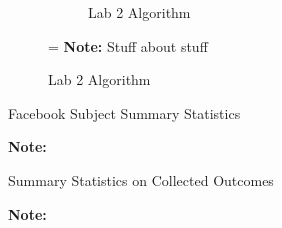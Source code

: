 \documentclass[12pt,letterpaper]{article}
\begin{document}
\begin{figure}[ht]
\begin{subfigure}{.5\textwidth}
        \caption{Lab 2 Algorithm}
         \label{fig:lab2_algo}
    \end{subfigure}
=
\footnotesize \textbf{Note:} Stuff about stuff
\end{figure}



\begin{table}[]
    \caption{Facebook Subject Summary Statistics}
    \begin{center}
    
    \label{tab:sumstats_p}
    \end{center}
\footnotesize \textbf{Note:} 
\end{table}

%

%


\begin{table}[]
\caption{Summary Statistics on Collected Outcomes}
    \begin{center}
    
    \label{tab:sumstats_o}
    \end{center}
\footnotesize \textbf{Note:} 
\end{table}

\end{document}
